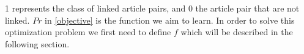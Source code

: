 1 represents the class of linked article pairs, and 0 the article pair that are not linked. $Pr$ in \cref{objective} is the function we aim to learn. In order to solve this optimization problem we first need to define $f$ which will be described in the following section.








